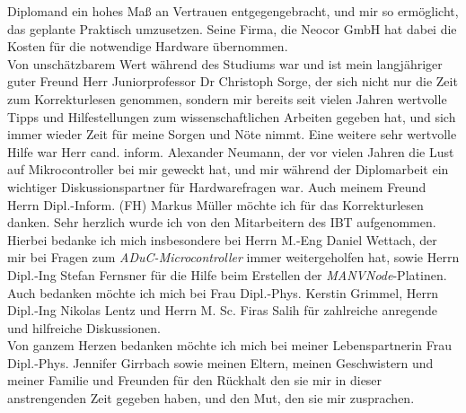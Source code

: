 Diplomand ein hohes Maß an Vertrauen entgegengebracht, und mir so ermöglicht, das geplante Praktisch umzusetzen. Seine Firma,
die Neocor GmbH hat dabei die Kosten für die notwendige Hardware übernommen.\\
Von unschätzbarem Wert während des Studiums war und ist mein langjähriger guter Freund Herr Juniorprofessor Dr Christoph
Sorge, der sich nicht nur die Zeit zum Korrekturlesen genommen, sondern mir bereits seit vielen Jahren wertvolle
Tipps und Hilfestellungen zum wissenschaftlichen Arbeiten gegeben hat, und sich immer wieder Zeit für meine Sorgen 
und Nöte nimmt.  Eine weitere sehr wertvolle Hilfe war Herr cand. inform. Alexander Neumann, der vor vielen Jahren 
die Lust auf 
Mikrocontroller bei mir geweckt hat, und mir während der Diplomarbeit ein wichtiger Diskussionspartner für 
Hardwarefragen war. Auch meinem Freund Herrn Dipl.-Inform. (FH) Markus Müller möchte ich für das Korrekturlesen danken.
Sehr herzlich wurde ich von den Mitarbeitern des IBT aufgenommen. Hierbei bedanke ich mich insbesondere bei Herrn
M.-Eng Daniel Wettach, der mir bei Fragen zum \emph{ADuC-Microcontroller} immer weitergeholfen hat, sowie Herrn
Dipl.-Ing Stefan Fernsner für die Hilfe beim Erstellen der \emph{MANVNode}-Platinen. Auch bedanken möchte ich mich bei 
Frau Dipl.-Phys. Kerstin Grimmel, Herrn Dipl.-Ing Nikolas 
Lentz und Herrn M. Sc. Firas Salih für zahlreiche anregende und hilfreiche Diskussionen.\\
Von ganzem Herzen bedanken möchte ich mich bei meiner Lebenspartnerin Frau Dipl.-Phys. Jennifer Girrbach sowie meinen Eltern,
meinen Geschwistern und meiner Familie und Freunden für den Rückhalt den sie mir in dieser anstrengenden Zeit gegeben
haben, und den Mut, den sie mir zusprachen.
